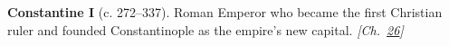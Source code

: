 \textbf{Constantine I} (c. 272–337). Roman Emperor who became the first Christian ruler and founded Constantinople as the empire's new capital. \emph{[Ch.~\hyperref[ch:jewishcalendar]{26}]}

